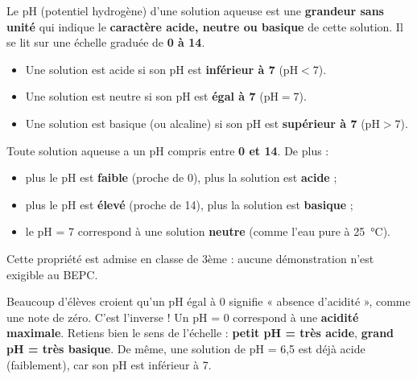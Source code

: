 \documentclass[11pt]{article}
\newcommand{\cle}[1]{{\popxbold\color{popdark}#1}}
\begin{document}
\begin{definition}
Le \cle{pH} (potentiel hydrogène) d'une solution aqueuse est une \textbf{grandeur sans unité} qui indique le \textbf{caractère acide, neutre ou basique} de cette solution. Il se lit sur une échelle graduée de \textbf{0 à 14}.
\end{definition}

\begin{definition}
\begin{itemize}
\item Une solution est \cle{acide} si son pH est \textbf{inférieur à 7} ($\text{pH} < 7$).
\item Une solution est \cle{neutre} si son pH est \textbf{égal à 7} ($\text{pH} = 7$).
\item Une solution est \cle{basique} (ou alcaline) si son pH est \textbf{supérieur à 7} ($\text{pH} > 7$).
\end{itemize}
\end{definition}

\begin{propriete}
Toute solution aqueuse a un pH compris entre \textbf{0 et 14}. De plus :
\begin{itemize}
\item plus le pH est \textbf{faible} (proche de 0), plus la solution est \textbf{acide} ;
\item plus le pH est \textbf{élevé} (proche de 14), plus la solution est \textbf{basique} ;
\item le pH = 7 correspond à une solution \textbf{neutre} (comme l'eau pure à \SI{25}{\celsius}).
\end{itemize}
Cette propriété est admise en classe de 3ème : aucune démonstration n'est exigible au BEPC.
\end{propriete}

\begin{attention}[Piège classique : pH = 0 ne veut pas dire « pas d'acidité »]
Beaucoup d'élèves croient qu'un pH égal à 0 signifie « absence d'acidité », comme une note de zéro. C'est l'inverse ! Un pH = 0 correspond à une \textbf{acidité maximale}. Retiens bien le sens de l'échelle : \textbf{petit pH = très acide}, \textbf{grand pH = très basique}. De même, une solution de pH = 6,5 est déjà acide (faiblement), car son pH est inférieur à 7.
\end{attention}
\end{document}
